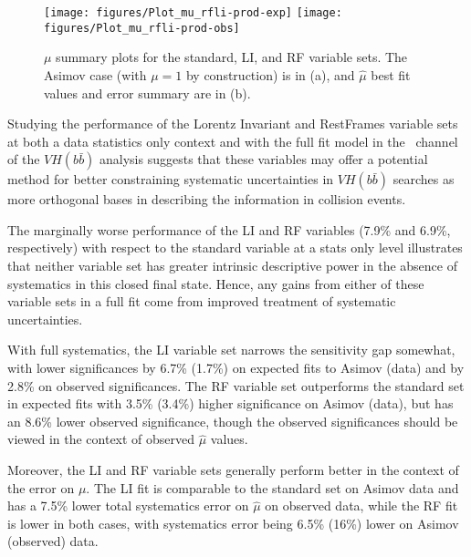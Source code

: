 \begin{figure}[!htbp]\captionsetup{justification=centering}
  \centering
    \texttt{[image: figures/Plot\_mu\_rfli-prod-exp]}
    \texttt{[image: figures/Plot\_mu\_rfli-prod-obs]}
  \caption{$\mu$ summary plots for the standard, LI, and RF variable sets.  The Asimov case (with $\mu=1$ by construction) is in (a), and $\hat{\mu}$ best fit values and error summary are in (b).}
  \label{fig:MuhatSummary}
\end{figure}

Studying the performance of the Lorentz Invariant and RestFrames variable sets at both a data statistics only context and with the full fit model in the \ZH\, channel of the $VH\left(b\bar{b}\right)$ analysis suggests that these variables may offer a potential method for better constraining systematic uncertainties in $VH\left(b\bar{b}\right)$ searches as more orthogonal bases in describing the information in collision events.  

The marginally worse performance of the LI and RF variables (7.9\% and 6.9\%, respectively) with respect to the standard variable at a stats only level illustrates that neither variable set has greater intrinsic descriptive power in the absence of systematics in this closed final state.  Hence, any gains from either of these variable sets in a full fit come from improved treatment of systematic uncertainties.

With full systematics, the LI variable set narrows the sensitivity gap somewhat, with lower significances by 6.7\% (1.7\%) on expected fits to Asimov (data) and by 2.8\% on observed significances.  The RF variable set outperforms the standard set in expected fits with 3.5\% (3.4\%) higher significance on Asimov (data), but has an 8.6\% lower observed significance, though the observed significances should be viewed in the context of observed $\hat{\mu}$ values.

Moreover, the LI and RF variable sets generally perform better in the context of the error on $\mu$.  The LI fit is comparable to the standard set on Asimov data and has a 7.5\% lower total systematics error on $\hat{\mu}$ on observed data, while the RF fit is lower in both cases, with systematics error being 6.5\% (16\%) lower on Asimov (observed) data.  



